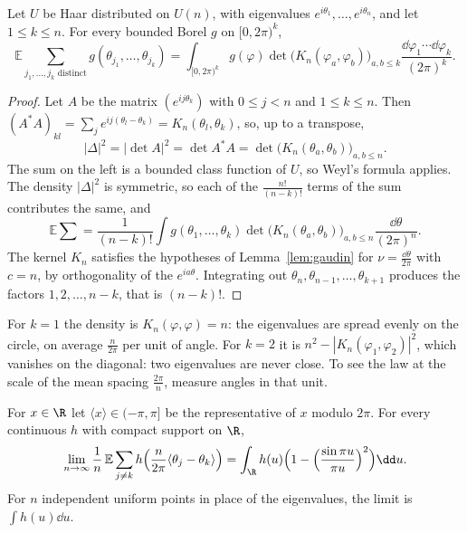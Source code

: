 \begin{theorem}\label{thm:correlations}
Let $U$ be Haar distributed on $U(n)$, with eigenvalues $e^{i\theta_1},\dots,e^{i\theta_n}$, and let $1\le k\le n$. For every bounded Borel $g$ on $[0,2\pi)^k$,
\[\mathbb E\sum_{j_1,\dots,j_k\text{ distinct}}g(\theta_{j_1},\dots,\theta_{j_k})=\int_{[0,2\pi)^k}g(\varphi)\det\bigl(K_n(\varphi_a,\varphi_b)\bigr)_{a,b\le k}\frac{\dd\varphi_1\cdots\dd\varphi_k}{(2\pi)^k}.\]
\end{theorem}

\begin{proof}
Let $A$ be the matrix $(e^{ij\theta_k})$ with $0\le j<n$ and $1\le k\le n$. Then $(A^*A)_{kl}=\sum_je^{ij(\theta_l-\theta_k)}=K_n(\theta_l,\theta_k)$, so, up to a transpose,
\[|\Delta|^2=|\det A|^2=\det A^*A=\det\bigl(K_n(\theta_a,\theta_b)\bigr)_{a,b\le n}.\] The sum
on the left is a bounded class function of $U$, so Weyl's formula applies. The density $|\Delta|^2$ is symmetric, so each of the $\frac{n!}{(n-k)!}$ terms of the sum contributes the same, and
\[\mathbb E\sum=\frac1{(n-k)!}\int g(\theta_1,\dots,\theta_k)\det\bigl(K_n(\theta_a,\theta_b)\bigr)_{a,b\le n}\frac{\dd\theta}{(2\pi)^n}.\]
The kernel $K_n$ satisfies the hypotheses of Lemma~\ref{lem:gaudin} for $\nu=\frac{\dd\theta}{2\pi}$ with $c=n$, by orthogonality of the $e^{ia\theta}$. Integrating out $\theta_n,\theta_{n-1},\dots,\theta_{k+1}$ produces the factors
$1,2,\dots,n-k$, that is $(n-k)!$.
\end{proof}

For $k=1$ the density is $K_n(\varphi,\varphi)=n$: the eigenvalues are spread evenly on the circle, on average $\frac n{2\pi}$ per unit of angle. For $k=2$ it is $n^2-|K_n(\varphi_1,\varphi_2)|^2$, which vanishes
on the diagonal: two eigenvalues are never close. To see the law at the scale of the mean spacing $\frac{2\pi}n$, measure angles in that unit.

\begin{corollary}\label{cor:dyson}
For $x\in\R$ let $\langle x\rangle\in(-\pi,\pi]$ be the representative of $x$ modulo $2\pi$. For every continuous $h$ with compact support on $\R$,
\[\lim_{n\to\infty}\frac1n\,\mathbb E\sum_{j\neq k}h\Bigl(\frac n{2\pi}\langle\theta_j-\theta_k\rangle\Bigr)=\int_{\R}h(u)\Bigl(1-\Bigl(\frac{\sin\pi u}{\pi u}\Bigr)^2\Bigr)\dd u.\]
For $n$ independent uniform points in place of the eigenvalues, the limit is $\int h(u)\dd u$.
\end{corollary}

